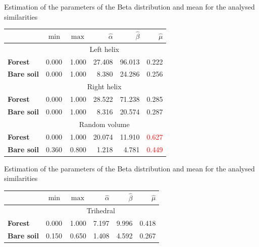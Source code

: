 \documentclass[10pt]{beamer}
\begin{document}
\begin{frame}[fragile]{Estimation of the parameters of the Beta distribution and mean for the analysed similarities}
    \begin{table}[hbt]
    \centering
    \begin{tabular}{lrrrrr}
    \toprule
    & $\min$ & $\max$ & $\widehat\alpha$ & $\widehat\beta$ & $\widehat\mu$\\ \midrule
    & \multicolumn{5}{c}{Left helix}\\
    \cmidrule(lr){2-6}
    \textbf{Forest} & 0.000 & 1.000 & 27.408 & 96.013 & 0.222\\
    \textbf{Bare soil} & 0.000 & 1.000 & 8.380 & 24.286 & 0.256\\
    \midrule
    & \multicolumn{5}{c}{Right helix}\\
    \cmidrule(lr){2-6}
    \textbf{Forest} & 0.000 & 1.000 & 28.522 & 71.238 & 0.285\\
    \textbf{Bare soil} & 0.000 & 1.000 & 8.316 & 20.574 & 0.287\\
    \midrule
    & \multicolumn{5}{c}{Random volume}\\
    \cmidrule(lr){2-6}
    \textbf{Forest} & 0.000 & 1.000 & 20.074 & 11.910 & \textcolor{red}{0.627}\\
    \textbf{Bare soil} & 0.360 & 0.800 & 1.218 & 4.781 & \textcolor{red}{0.449}\\
    \bottomrule
    \end{tabular}
    \end{table}
\end{frame}

\begin{frame}[fragile]{Estimation of the parameters of the Beta distribution and mean for the analysed similarities}
    \begin{table}[hbt]
    \centering
    \begin{tabular}{lrrrrr}
    \toprule
    & $\min$ & $\max$ & $\widehat\alpha$ & $\widehat\beta$ & $\widehat\mu$\\ \midrule
    & \multicolumn{5}{c}{Trihedral}\\
    \cmidrule(lr){2-6}
    \textbf{Forest} & 0.000 & 1.000 & 7.197 & 9.996 & 0.418\\
    \textbf{Bare soil} & 0.150 & 0.650 & 1.408 & 4.592 & 0.267\\
    \bottomrule
    \end{tabular}
    \end{table}
\end{frame}
\end{document}
